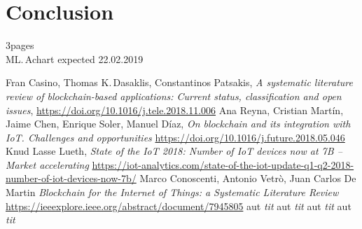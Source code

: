 \documentclass[11pt]{article}
\begin{document}
\section{Conclusion}
3pages\\
ML.\,Achart expected 22.02.2019

\begin{thebibliography}{9}

	Fran Casino, Thomas K.\,Dasaklis, Constantinos Patsakis,
	\textit{A systematic literature review of blockchain-based applications: Current status, classification and open issues},
	\hyperref[https://doi.org/10.1016/j.tele.2018.11.006]{https://doi.org/10.1016/j.tele.2018.11.006}
	Ana Reyna, Cristian Martín, Jaime Chen, Enrique Soler, Manuel Díaz,
	\textit{On blockchain and its integration with IoT. Challenges and opportunities}
	\hyperref[https://doi.org/10.1016/j.future.2018.05.046]{https://doi.org/10.1016/j.future.2018.05.046}
	Knud Lasse Lueth,
	\textit{State of the IoT 2018: Number of IoT devices now at 7B – Market accelerating}
	\hyperref[https://iot-analytics.com/state-of-the-iot-update-q1-q2-2018-number-of-iot-devices-now-7b/]{https://iot-analytics.com/state-of-the-iot-update-q1-q2-2018-number-of-iot-devices-now-7b/}
	Marco Conoscenti, Antonio Vetrò, Juan Carlos De Martin
	\textit{Blockchain for the Internet of Things: a Systematic Literature Review}
	\hyperref[https://ieeexplore.ieee.org/abstract/document/7945805]{https://ieeexplore.ieee.org/abstract/document/7945805}
	aut
	\textit{tit}
	\hyperref[]{}
	aut
	\textit{tit}
	\hyperref[]{}
	aut
	\textit{tit}
	\hyperref[]{}
	aut
	\textit{tit}
	\hyperref[]{}



\end{thebibliography}

	
\end{document}
